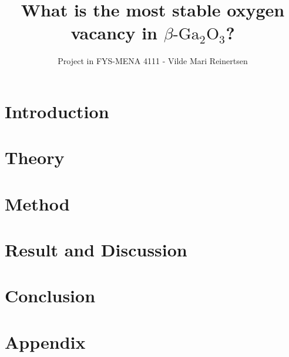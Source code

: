 

\title{What is the most stable oxygen vacancy in $\beta\text{-Ga}_2\text{O}_3$?}
\author{Project in FYS-MENA 4111 - Vilde Mari Reinertsen}
\raggedbottom
\date{}


\maketitle



\begin{abstract}


\newpage

\tableofcontents
\end{abstract}

\twocolumn

\section{Introduction}


\section{Theory}


\section{Method}


\section{Result and Discussion}


%

\section{Conclusion}


\newpage



\section*{Appendix}



